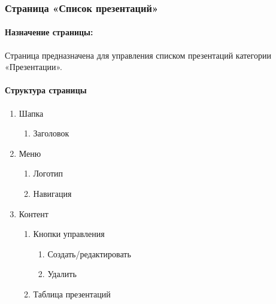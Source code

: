 \subsubsection{Страница «Список презентаций»}
\paragraph{Назначение страницы:} Страница предназначена для управления списком презентаций категории «Презентации».

\paragraph{Структура страницы}
\begin{enumerate}
    \item Шапка
    \begin{enumerate}
        \item Заголовок
    \end{enumerate}

    \item Меню
    \begin{enumerate}
        \item Логотип
        \item Навигация
    \end{enumerate}

    \item Контент
    \begin{enumerate}
        \item Кнопки управления
        \begin{enumerate}
            \item Создать/редактировать
            \item Удалить
        \end{enumerate}
        \item Таблица презентаций
    \end{enumerate}
\end{enumerate}

